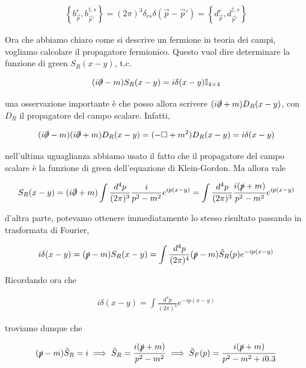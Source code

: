 \documentclass[11pt]{report}
\begin{document}
\begin{align}
    \left\{b_{\vec{p}}^r, b_{\vec{p}'}^{\dagger, s}\right\} = (2\pi)^3 \delta_{rs}\delta(\vec{p}-\vec{p}') = \left\{d_{\vec{p}}^r, d_{\vec{p}'}^{\dagger, s}\right\}
\end{align}

Ora che abbiamo chiaro come si descrive un fermione in teoria dei campi, vogliamo calcolare il propagatore fermionico. Questo vuol dire determinare la funzione di green \(S_R(x-y)\), t.c. 

\begin{align}
    (i\slashed{\partial} -m)S_R(x-y) = i\delta(x-y)\mathbb{I}_{4\times 4}
\end{align}

una osservazione importante è che posso allora scrivere \((i\slashed{\partial}+m)D_R(x-y)\), con \(D_R\) il propagatore del campo scalare. Infatti, 

\begin{align}
    (i\slashed{\partial} -m)(i\slashed{\partial} +m)D_R(x-y) = (-\square + m^2)D_R(x-y) = i\delta(x-y)
\end{align}

nell'ultima uguaglianza abbiamo usato il fatto che il propagatore del campo scalare è la funzione di green dell'equazione di Klein-Gordon. Ma allora vale 

\begin{align}
    S_R(x-y) = (i\slashed{\partial} + m)\int \frac{d^4p}{(2\pi)^3}\frac{i}{p^2 -m^2}e^{ip(x-y)} = \int \frac{d^4p}{(2\pi)^3}\frac{i(\slashed{p}+m)}{p^2 -m^2}e^{ip(x-y)} 
\end{align}

d'altra parte, potevamo ottenere immediatamente lo stesso risultato passando in trasformata di Fourier, 

\begin{align}
    i\delta(x-y) = (\slashed{p}-m)S_R(x-y) = \int \frac{d^4p}{(2\pi)^4}(\slashed{p}-m)\tilde{S}_R(p)e^{-ip(x-y)}
\end{align}

Ricordando ora che 

\begin{align}
    i\delta(x-y) = \int \frac{d^4p}{(2\pi)^4}e^{-ip(x-y)}
\end{align}

troviamo dunque che

\begin{align}
    (\slashed{p}-m)\tilde{S}_R = i \implies \tilde{S}_R = \frac{i(\slashed{p}+m)}{p^2-m^2} \implies \tilde{S}_F(p) = \frac{i(\slashed{p}+m)}{p^2 -m^2 +i0.3} 
\end{align}
\end{document}
